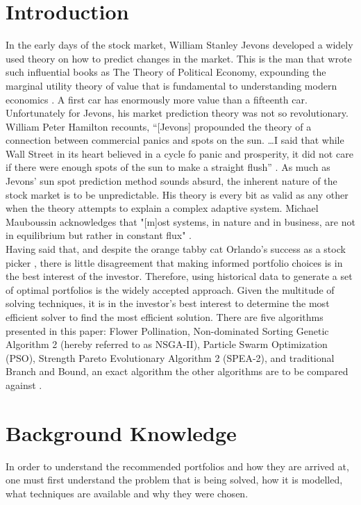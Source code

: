 \documentclass{article}
\begin{document}
    \section{Introduction}
    In the early days of the stock market, William Stanley Jevons developed a widely used theory on how to predict changes in the market.
    This is the man that wrote such influential books as The Theory of Political Economy, expounding the marginal utility theory of value that 
    is fundamental to understanding modern economics \cite{Jevons}. A first car has enormously more value than a fifteenth car. Unfortunately for Jevons, 
    his market prediction theory was not so revolutionary. William Peter Hamilton recounts, ``[Jevons] propounded the theory of a connection between 
    commercial panics and spots on the sun. \ldots I said that while Wall Street in its heart believed in a cycle fo panic and prosperity, 
    it did not care if there were enough spots of the sun to make a straight flush'' \cite{Hamilton}. As much as Jevons' sun spot prediction method
    sounds absurd, the inherent nature of the stock market is to be unpredictable. His theory is every bit as valid as any other when the theory 
    attempts to explain a complex adaptive system. Michael Mauboussin acknowledges that "[m]ost systems, in nature and in business,
    are not in equilibrium but rather in constant flux" \cite{Mauboussin}. \\
    Having said that, and despite the orange tabby cat Orlando's success as a stock picker \cite{King}, there is little disagreement that making
    informed portfolio choices is in the best interest of the investor. Therefore, using historical data to generate a set of optimal portfolios
    is the widely accepted approach. Given the multitude of solving techniques, it is in the investor's best interest to determine the most efficient solver
    to find the most efficient solution. There are five algorithms presented in this paper: Flower Pollination, Non-dominated Sorting Genetic 
    Algorithm 2 (hereby referred to as NSGA-II), Particle Swarm Optimization (PSO), Strength Pareto Evolutionary Algorithm 2 (SPEA-2), and traditional
    Branch and Bound, an exact algorithm the other algorithms are to be compared against \cite{Yang} \cite{KaucicMoradiMirzazadeh} \cite{Guerard}. 
    \section{Background Knowledge}
    In order to understand the recommended portfolios and how they are arrived at, one must first understand the problem that is being solved, how it is 
    modelled, what techniques are available and why they were chosen. 
\end{document}
